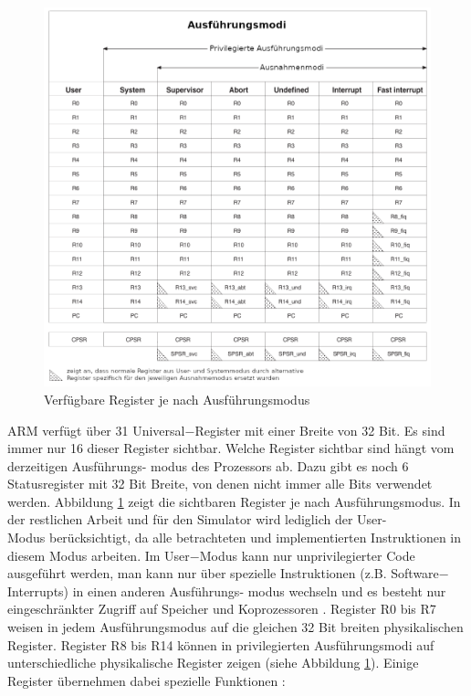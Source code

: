 \documentclass[a4paper, 11pt, onecolumn]{article}
\begin{document}
\begin{figure}[!htb]
\centering
\includegraphics[width=1\textwidth]{data/registers}
\caption[Ausführungsmodi und Register]{Verfügbare Register je nach Ausführungsmodus \cite{arm:2005}}
\label{fig:registers}
\end{figure}

ARM verfügt über 31 Universal$-$Register mit einer Breite von 32 Bit. Es sind immer nur 16 dieser Register sichtbar. Welche Register sichtbar sind hängt vom derzeitigen Ausführungs-
modus des Prozessors ab. Dazu gibt es noch 6 Statusregister mit 32 Bit Breite, von denen nicht immer alle Bits verwendet werden. Abbildung \ref{fig:registers} zeigt die sichtbaren Register je nach Ausführungsmodus. In der restlichen Arbeit und für den Simulator wird lediglich der User-\\
Modus berücksichtigt, da alle betrachteten und implementierten Instruktionen in diesem Modus arbeiten. Im User$-$Modus kann nur unprivilegierter Code ausgeführt werden, man kann nur über spezielle Instruktionen (z.B. Software$-$Interrupts) in einen anderen Ausführungs-
modus wechseln und es besteht nur eingeschränkter Zugriff auf Speicher und Koprozessoren \cite{arm:2005}. Register R0 bis R7 weisen in jedem Ausführungsmodus auf die gleichen 32 Bit breiten physikalischen Register. Register R8 bis R14 können in privilegierten Ausführungsmodi auf unterschiedliche physikalische Register zeigen (siehe Abbildung \ref{fig:registers}). Einige Register übernehmen dabei spezielle Funktionen \cite{arm:2005}:
\end{document}
